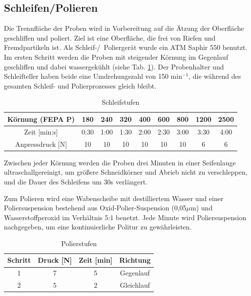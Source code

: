 \subsection{Schleifen/Polieren}

Die Trennfläche der Proben wird in Vorbereitung auf die Ätzung der Oberfläche geschliffen und poliert. Ziel ist eine Oberfläche, die frei von Riefen und Fremdpartikeln ist. Als Schleif-/~Poliergerät wurde ein ATM Saphir 550 benutzt.
Im ersten Schritt werden die Proben mit steigender Körnung im Gegenlauf geschliffen und dabei wassergekühlt (siehe Tab. \ref{tab:Schleifstufen}). Der Probenhalter und Schleifteller haben beide eine Umdrehungszahl von 150 min$^{-1}$, die während des gesamten Schleif- und Polierprozesses gleich bleibt.   

\begin{table}[]
	\centering
	\begin{tabular}{|c|c|c|c|c|c|c|c|c|}
		
		\hline 
		Körnung (FEPA P) & 180 & 240 & 320 & 400 & 600 & 800 & 1200 & 2500 \\ 
		\hline 
		Zeit [min:s] & 0:30 & 1:00 & 1:30 & 2:00 & 2:30 & 3:00 & 3:30 & 4:00 \\ 
		\hline 
		Anpressdruck [N] & 10&10&10&10&10&10&6&6\\
		\hline
	\end{tabular} 
	\caption{Schleifstufen}
	\label{tab:Schleifstufen}
\end{table}

Zwischen jeder Körnung werden die Proben drei Minuten in einer Seifenlauge ultraschallgereinigt, um größere Schneidkörner und Abrieb nicht zu verschleppen, und die Dauer des Schleifens um 30s verlängert. 

Zum Polieren wird eine Wabenscheibe mit destilliertem Wasser und einer Poliersuspension bestehend aus Oxid-Polier-Suspension (0,05$\mu$m) und Wasserstoffperoxid im Verhältnis 5:1 benetzt. Jede Minute wird Poliersuspension nachgegeben, um eine kontinuierliche Politur zu gewährleisten.

\begin{table}[h]
	\centering
	
	\begin{tabular}{|c|c|c|c|}
		\hline 
		Schritt & Druck [N] & Zeit [min] & Richtung \\ 
		\hline 
		1 & 7 & 5 & Gegenlauf \\ 
		\hline 
		2 & 5 & 2 & Gleichlauf \\ 
		\hline 
	\end{tabular} 
	\caption{Polierstufen}
	\label{tab:Polierstufen}
\end{table}


